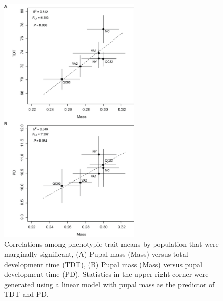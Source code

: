 \documentclass[smallextended]{svjour3}
\begin{document}
\begin{figure}[h]
\centering
\includegraphics[width=0.6\textwidth]{media/image2.png}
\caption{Correlations among phenotypic trait means by
population that were marginally significant, (A) Pupal mass (Mass)
versus total development time (TDT), (B) Pupal mass (Mass) versus pupal
development time (PD). Statistics in the upper right corner were
generated using a linear model with pupal mass as the predictor of TDT
and PD.}
\label{fig:traitcorr}
\end{figure}

\newpage
\end{document}
